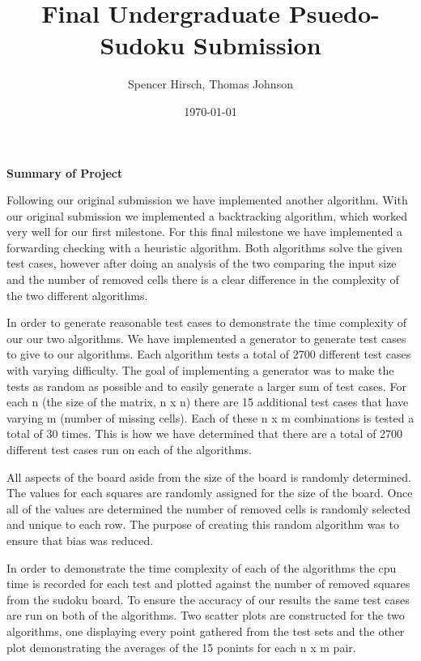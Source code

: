 \documentclass{article}
\begin{document}
\title{\textbf{Final Undergraduate Psuedo-Sudoku Submission}}
\author{Spencer Hirsch, Thomas Johnson}
\date{\today}

\maketitle

\noindent \textbf{Summary of Project}

\medskip

Following our original submission we have implemented another algorithm. With 
our original submission we implemented a backtracking algorithm, which worked
very well for our first milestone. For this final milestone we have implemented
a forwarding checking with a heuristic algorithm. Both algorithms solve the given
test cases, however after doing an analysis of the two comparing the input size and
the number of removed cells there is a clear difference in the complexity of the
two different algorithms. 

In order to generate reasonable test cases to demonstrate the time complexity of our
our two algorithms. We have implemented a generator to generate test cases to give to
our algorithms. Each algorithm tests a total of 2700 different test cases with varying
difficulty. The goal of implementing a generator was to make the tests as random as 
possible and to easily generate a larger sum of test cases. For each n (the size of 
the matrix, n x n) there are 15 additional test cases that have varying m (number of 
missing cells). Each of these n x m combinations is tested a total of 30 times. This 
is how we have determined that there are a total of 2700 different test cases run on
each of the algorithms. 

All aspects of the board aside from the size of the board is randomly determined. The 
values for each squares are randomly assigned for the size of the board. Once all of
the values are determined the number of removed cells is randomly selected and unique 
to each row. The purpose of creating this random algorithm was to ensure that bias was 
reduced. 

In order to demonstrate the time complexity of each of the algorithms the cpu time is
recorded for each test and plotted against the number of removed squares from the sudoku
board. To ensure the accuracy of our results the same test cases are run on both of the
algorithms. Two scatter plots are constructed for the two algorithms, one displaying every
point gathered from the test sets and the other plot demonstrating the averages of the 15
ponints for each n x m pair. 
\end{document}

